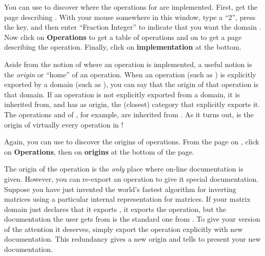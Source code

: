 {{{{{{{You can use \Browse{} to discover where the operations for
 are implemented.
First, get the page describing .
With your mouse somewhere in this window, type a ``2'', press the
 key, and then enter ``Fraction
Integer'' to indicate that you want the domain
.
Now click on {\bf Operations} to get a table of operations and on
\spadop{*} to get a page describing the \spadop{*} operation.
Finally, click on {\bf implementation} at the bottom.

%

Aside from the notion of where an operation is implemented,
a useful notion is  the {\it origin} or ``home'' of an operation.
When an operation (such as
) is explicitly exported by
a domain (such as ), you can say that the
origin of that operation is that domain.
If an operation is not explicitly exported from a domain, it is inherited
from, and has as origin, the (closest) category that explicitly exports it.
The operations  and
 of ,
for example, are inherited from .
As it turns out,  is the origin of virtually every
\spadop{+} operation in \Language{}!

Again, you can use \Browse{} to discover the origins of
operations.
From the \Browse{} page on , click on {\bf
Operations}, then on {\bf origins} at the bottom of the page.

The origin of the operation is the {\it only} place where on-line
documentation is given.
However, you can re-export an operation to give it special
documentation.
Suppose you have just invented the world's fastest algorithm for
inverting matrices using a particular internal representation for
matrices.
If your matrix domain just declares that it exports
, it exports the 
operation, but the documentation the user gets from \Browse{} is
the standard one from .
To give your version of  the attention it
deserves, simply export the operation explicitly with new
documentation.
This redundancy gives  a new origin and tells
\Browse{} to present your new documentation.

}}}}}}}
